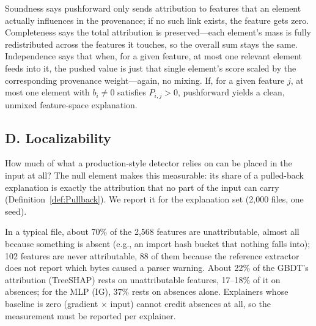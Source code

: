 

Soundness says pushforward only sends attribution to features that an element actually influences in the provenance; if no such link exists, the feature gets zero. Completeness says the total attribution is preserved—each element’s mass is fully redistributed across the features it touches, so the overall sum stays the same. Independence says that when, for a given feature, at most one relevant element feeds into it, the pushed value is just that single element’s score scaled by the corresponding provenance weight—again, no mixing. If, for a given feature $j$, at most one element with $b_i\neq 0$ satisfies $P_{i,j}>0$, pushforward yields a clean, unmixed feature-space explanation.

\subsection*{D. Localizability}
\label{sec:XML:AppLocalizability}

How much of what a production-style detector relies on can be placed in the input at all? The null element makes this measurable: its share of a pulled-back explanation is exactly the attribution that no part of the input can carry (Definition~\ref{def:Pullback}). We report it for the explanation set (2{,}000 files, one seed).

In a typical file, about 70\% of the 2{,}568 features are unattributable, almost all because something is absent (e.g., an import hash bucket that nothing falls into); 102 features are never attributable, 88 of them because the reference extractor does not report which bytes caused a parser warning. About 22\% of the GBDT's attribution (TreeSHAP) rests on unattributable features, 17--18\% of it on absences; for the MLP (IG), 37\% rests on absences alone. Explainers whose baseline is zero (gradient $\times$ input) cannot credit absences at all, so the measurement must be reported per explainer.

